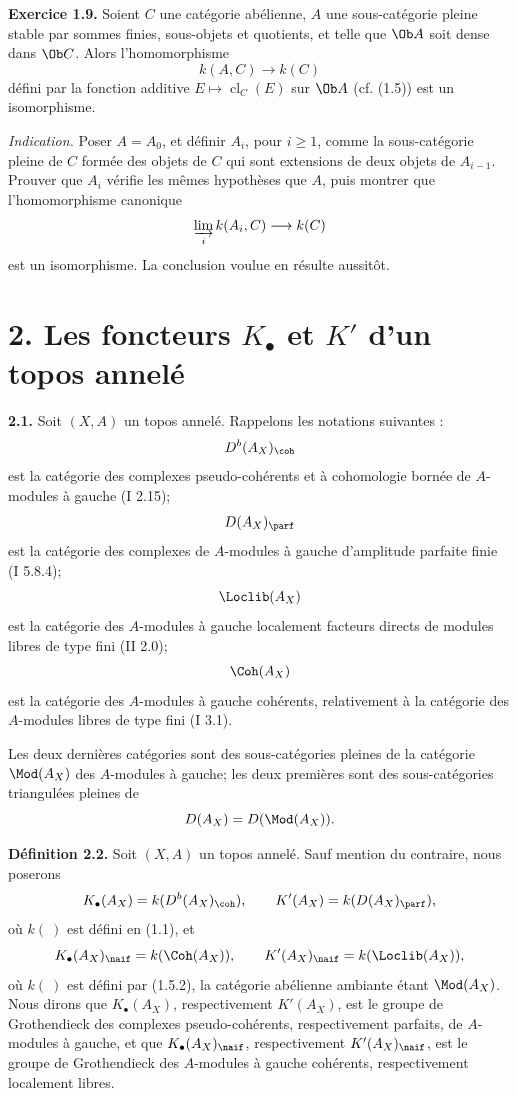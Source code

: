 \documentclass[11pt]{article}
\newcommand{\cl}{\operatorname{cl}}
\begin{document}
\textbf{Exercice 1.9.} Soient \(C\) une catégorie abélienne, \(A\) une sous-catégorie pleine stable par sommes finies, sous-objets et quotients, et telle que \(\Ob A\) soit dense dans \(\Ob C\). Alors l'homomorphisme
\[
 k(A,C)\longrightarrow k(C)
\]
défini par la fonction additive \(E\mapsto\cl_C(E)\) sur \(\Ob A\) (cf. (1.5)) est un isomorphisme.

\emph{Indication.} Poser \(A=A_0\), et définir \(A_i\), pour \(i\geq1\), comme la sous-catégorie pleine de \(C\) formée des objets de \(C\) qui sont extensions de deux objets de \(A_{i-1}\). Prouver que \(A_i\) vérifie les mêmes hypothèses que \(A\), puis montrer que l'homomorphisme canonique
\[
 \varinjlim_i k(A_i,C)\longrightarrow k(C)
\]
est un isomorphisme. La conclusion voulue en résulte aussitôt.

\section*{2. Les foncteurs \(K_{\bullet}\) et \(K'\) d'un topos annelé}

\textbf{2.1.} Soit \((X,A)\) un topos annelé. Rappelons les notations suivantes :
\[
 D^b(A_X)_{\coh}
\]
est la catégorie des complexes pseudo-cohérents et à cohomologie bornée de \(A\)-modules à gauche (I 2.15);
\[
 D(A_X)_{\parf}
\]
est la catégorie des complexes de \(A\)-modules à gauche d'amplitude parfaite finie (I 5.8.4);
\[
 \Loclib(A_X)
\]
est la catégorie des \(A\)-modules à gauche localement facteurs directs de modules libres de type fini (II 2.0);
\[
 \Coh(A_X)
\]
est la catégorie des \(A\)-modules à gauche cohérents, relativement à la catégorie des \(A\)-modules libres de type fini (I 3.1).

Les deux dernières catégories sont des sous-catégories pleines de la catégorie \(\Mod(A_X)\) des \(A\)-modules à gauche; les deux premières sont des sous-catégories triangulées pleines de
\[
 D(A_X)=D(\Mod(A_X)).
\]

\textbf{Définition 2.2.} Soit \((X,A)\) un topos annelé. Sauf mention du contraire, nous poserons
\[
 K_{\bullet}(A_X)=k(D^b(A_X)_{\coh}),\qquad
 K'(A_X)=k(D(A_X)_{\parf}),
\]
où \(k(\ )\) est défini en (1.1), et
\[
 K_{\bullet}(A_X)_{\naif}=k(\Coh(A_X)),\qquad
 K'(A_X)_{\naif}=k(\Loclib(A_X)),
\]
où \(k(\ )\) est défini par (1.5.2), la catégorie abélienne ambiante étant \(\Mod(A_X)\). Nous dirons que \(K_{\bullet}(A_X)\), respectivement \(K'(A_X)\), est le groupe de Grothendieck des complexes pseudo-cohérents, respectivement parfaits, de \(A\)-modules à gauche, et que \(K_{\bullet}(A_X)_{\naif}\), respectivement \(K'(A_X)_{\naif}\), est le groupe de Grothendieck des \(A\)-modules à gauche cohérents, respectivement localement libres.
\end{document}
